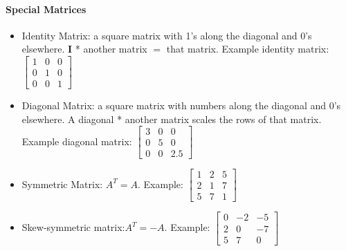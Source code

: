 \documentclass{article}
\begin{document}
\paragraph{Special Matrices}
\begin{itemize}
	\item Identity Matrix: a square matrix with 1's along the diagonal and 0's elsewhere. \textbf{I} * another matrix $=$ that matrix. Example identity matrix: $\begin{bmatrix}
    1 & 0 & 0 \\
    0 & 1 & 0 \\
    0 & 0 & 1 
\end{bmatrix}$
    \item Diagonal Matrix: a square matrix with numbers along the diagonal and 0's elsewhere. A diagonal * another matrix scales the rows of that matrix. Example diagonal matrix: $\begin{bmatrix}
    3 & 0 & 0 \\
    0 & 5 & 0 \\
    0 & 0 & 2.5 
\end{bmatrix}$
    \item Symmetric Matrix: $A^T = A$. Example: $\begin{bmatrix}
    1 & 2 & 5 \\
    2 & 1 & 7 \\
    5 & 7 & 1 
\end{bmatrix}$
    \item Skew-symmetric matrix:$A^T = -A$. Example: $\begin{bmatrix}
    0 & -2 & -5 \\
    2 & 0 & -7 \\
    5 & 7 & 0 
\end{bmatrix}$
\end{itemize}


\small


\end{document}
